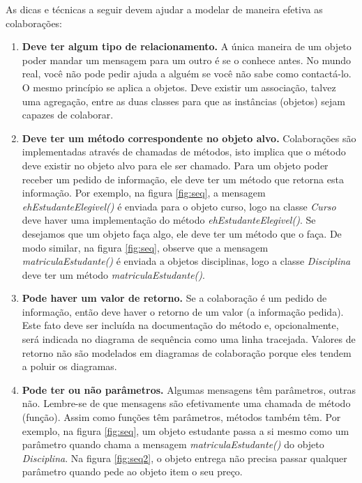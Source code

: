 \documentclass[
	11pt,				%
	openright,
	twoside,			%
	a4paper,			%
	english,			%
	french,
	brazil,				%
	sumario=tradicional
	]{abntex2}
\begin{document}
As dicas e técnicas a seguir devem ajudar a modelar de maneira efetiva as colaborações:

\begin{enumerate}
\item \textbf{Deve ter algum tipo de relacionamento.} A única maneira de um objeto poder mandar um mensagem para um outro é se o conhece antes. No mundo real, você não pode pedir ajuda a alguém se você não sabe como contactá-lo. O mesmo princípio se aplica a objetos. Deve existir um associação, talvez uma agregação, entre as duas classes para que as instâncias (objetos) sejam capazes de colaborar.

\item \textbf{Deve ter um método correspondente no objeto alvo.} Colaborações são implementadas através de chamadas de métodos, isto implica que o método deve existir no objeto alvo para ele ser chamado. Para um objeto poder receber um pedido de informação, ele deve ter um método que retorna esta informação. Por exemplo, na figura \ref{fig:seq}, a mensagem \emph{ehEstudanteElegivel()} é enviada para o objeto curso, logo na classe \emph{Curso} deve haver uma implementação do método \emph{ehEstudanteElegivel()}. Se desejamos que um objeto faça algo, ele deve ter um método que o faça. De modo similar, na figura \ref{fig:seq}, observe que a mensagem \emph{matriculaEstudante()} é enviada a objetos disciplinas, logo a classe \emph{Disciplina} deve ter um método \emph{matriculaEstudante()}.

\item \textbf{Pode haver um valor de retorno.} Se a colaboração é um pedido de informação, então deve haver o retorno de um valor (a informação pedida). Este fato deve ser incluída na documentação do método e, opcionalmente, será indicada no diagrama de sequência como uma linha tracejada. Valores de retorno não são modelados em diagramas de colaboração porque eles tendem a poluir os diagramas.

\item \textbf{Pode ter ou não parâmetros.} Algumas mensagens têm parâmetros, outras não. Lembre-se de que mensagens são efetivamente uma chamada de método (função). Assim como funções têm parâmetros, métodos também têm. Por exemplo, na figura \ref{fig:seq}, um objeto estudante passa a si mesmo como um parâmetro quando chama a mensagem \emph{matriculaEstudante()} do objeto \emph{Disciplina}. Na figura \ref{fig:seq2}, o objeto entrega não precisa passar qualquer parâmetro quando pede ao objeto item o seu preço.


\end{enumerate}
\end{document}
